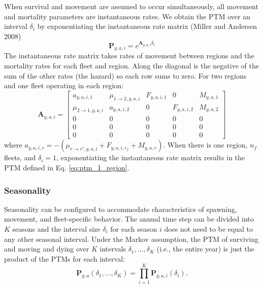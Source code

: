 \documentclass[
]{article}
\begin{document}
When survival and movement are assumed to occur simultaneously, all movement and mortality parameters are instantaneous rates. We obtain the PTM over an interval \(\delta_i\) by exponentiating the instantaneous rate matrix (Miller and Andersen 2008)
\begin{equation*}
\mathbf{P}_{y,a,i} = e^{\mathbf{A}_{y,a,i}\delta_i}
\end{equation*}
The instantaneous rate matrix takes rates of movement between regions and the mortality rates for each fleet and region. Along the diagonal is the negative of the sum of the other rates (the hazard) so each row sums to zero. For two regions and one fleet operating in each region:
\begin{equation*}
 \mathbf{A}_{y,a,i} = \begin{bmatrix}
 a_{y,a,i,1} & \mu_{1\rightarrow 2,y,a,i} & F_{y,a,i,1} & 0 & M_{y,a,1} \\
 \mu_{2\rightarrow 1,y,a,i} &  a_{y,a,i,2} & 0 & F_{y,a,i,2} & M_{y,a,2} \\
 0 & 0 & 0 & 0 & 0 \\
 0 & 0 & 0 & 0 & 0 \\
 0 & 0 & 0 & 0 & 0
 \end{bmatrix}
\end{equation*}
where \(a_{y,a,i,r} = -(\mu_{r\rightarrow r',y,a,i} + F_{y,a,i,r_f} + M_{y,a,r})\). When there is one region, \(n_f\) fleets, and \(\delta_i = 1\), exponentiating the instantaneous rate matrix results in the PTM defined in Eq. \ref{eq:ptm_1_region}.

\hypertarget{seasonality}{%
\subsubsection*{Seasonality}\label{seasonality}}

Seasonality can be configured to accommodate characteristics of spawning, movement, and fleet-specific behavior. The annual time step can be divided into \(K\) seasons and the interval size \(\delta_i\) for each season \(i\) does not need to be equal to any other seasonal interval. Under the Markov assumption, the PTM of surviving and moving and dying over \(K\) intervals \(\delta_1,\ldots, \delta_K\) (i.e., the entire year) is just the product of the PTMs for each interval:
\[ \mathbf{P}_{y,a}(\delta_1,\ldots,\delta_K) = \prod^K_{i=1}\mathbf{P}_{y,a,i}(\delta_i).\]
\end{document}

